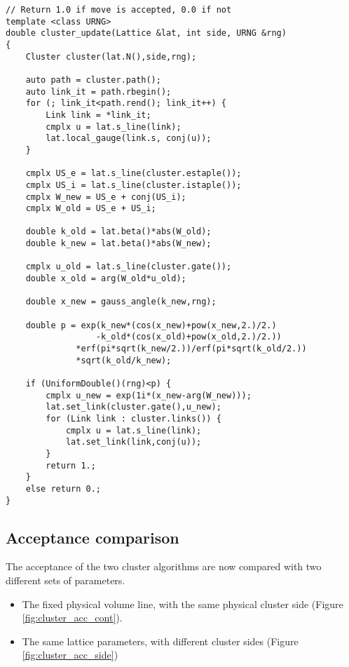 \begin{lstlisting}[caption={Metropolis-Hastings cluster update}]
// Return 1.0 if move is accepted, 0.0 if not
template <class URNG>
double cluster_update(Lattice &lat, int side, URNG &rng)
{
    Cluster cluster(lat.N(),side,rng);

    auto path = cluster.path();
    auto link_it = path.rbegin();
    for (; link_it<path.rend(); link_it++) {
        Link link = *link_it;
        cmplx u = lat.s_line(link);
        lat.local_gauge(link.s, conj(u));
    }
    
    cmplx US_e = lat.s_line(cluster.estaple());
    cmplx US_i = lat.s_line(cluster.istaple());
    cmplx W_new = US_e + conj(US_i);
    cmplx W_old = US_e + US_i;
    
    double k_old = lat.beta()*abs(W_old);
    double k_new = lat.beta()*abs(W_new);

    cmplx u_old = lat.s_line(cluster.gate());
    double x_old = arg(W_old*u_old);
    
    double x_new = gauss_angle(k_new,rng);
    
    double p = exp(k_new*(cos(x_new)+pow(x_new,2.)/2.)
                  -k_old*(cos(x_old)+pow(x_old,2.)/2.))
              *erf(pi*sqrt(k_new/2.))/erf(pi*sqrt(k_old/2.))
              *sqrt(k_old/k_new);
    
    if (UniformDouble()(rng)<p) {
        cmplx u_new = exp(1i*(x_new-arg(W_new)));
        lat.set_link(cluster.gate(),u_new);
        for (Link link : cluster.links()) {
            cmplx u = lat.s_line(link);
            lat.set_link(link,conj(u));
        }
        return 1.;
    }
    else return 0.;
}
\end{lstlisting}

\subsection*{Acceptance comparison}

The acceptance of the two cluster algorithms are now compared with two different sets of parameters.
\begin{itemize}
    \item
        The fixed physical volume line,
        with the same physical cluster side (Figure \ref{fig:cluster_acc_cont}).
    \item
        The same lattice parameters, with different cluster sides (Figure \ref{fig:cluster_acc_side})
\end{itemize}

